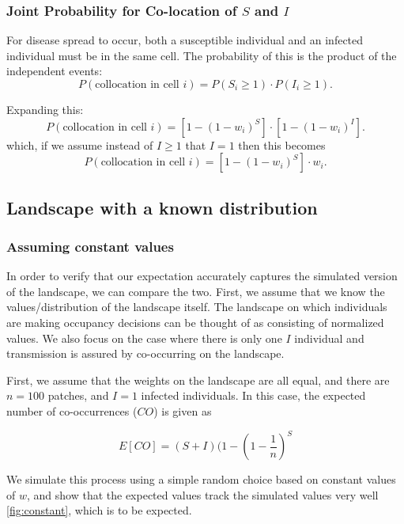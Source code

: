 \subsubsection{Joint Probability for Co-location of $S$ and $I$}
For disease spread to occur, both a susceptible individual and an infected individual must be in the same cell. The probability of this is the product of the independent events:
\begin{equation}
P(\text{collocation in cell } i) = P(S_{i} \geq 1) \cdot P(I_{i} \geq 1).
\end{equation}

Expanding this:
\begin{equation}
P(\text{collocation in cell } i) = \left[ 1 - (1 - w_{i})^S \right] \cdot \left[ 1 - (1 - w_{i})^I \right].
\end{equation}
which, if we assume instead of $I\geq1$ that $I=1$ then this becomes
\begin{equation}
P(\text{collocation in cell } i) = \left[ 1 - (1 - w_{i})^S \right] \cdot w_i.
\end{equation}

\subsection{Landscape with a known distribution}

\subsubsection{Assuming constant values}

In order to verify that our expectation accurately captures the simulated version of the landscape, we can compare the two. First, we assume that we know the values/distribution of the landscape itself. The landscape on which individuals are making occupancy decisions can be thought of as consisting of normalized values. We also focus on the case where there is only one $I$ individual and transmission is assured by co-occurring on the landscape.

First, we assume that the weights on the landscape are all equal, and there are $n=100$ patches, and $I=1$ infected individuals. In this case, the expected number of co-occurrences ($CO$) is given as 

\begin{equation}
    E[CO] = (S+I)(1-(1-\frac{1}{n})^S
\end{equation}

We simulate this process using a simple random choice based on constant values of $w$, and show that the expected values track the simulated values very well \cref{fig:constant}, which is to be expected.

